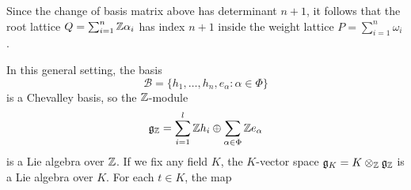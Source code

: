 Since the change of basis matrix above has determinant $n+1$, it follows that the root lattice $Q=\sum_{i=1}^n\mathbb{Z}\alpha_i$ has index $n+1$ inside the weight lattice $P=\sum_{i=1}^n\omega_i$.

In this general setting, the basis 
$$\mathcal{B}=\{h_1,\ldots,h_n,e_\alpha:\alpha\in\Phi\}$$
is a Chevalley basis, so the $\mathbb{Z}$-module
$$\mathfrak{g}_{\mathbb{Z}}=\sum_{i=1}^{l}\mathbb{Z} h_i\oplus\sum_{\alpha\in\Phi}\mathbb{Z} e_\alpha$$
is a Lie algebra over $\mathbb{Z}$. If we fix any field $K$, the $K$-vector space $\mathfrak{g}_K=K\otimes_{\mathbb{Z}}\mathfrak{g}_{\mathbb{Z}}$ is a Lie algebra over $K$. For each $t\in K$, the map  



